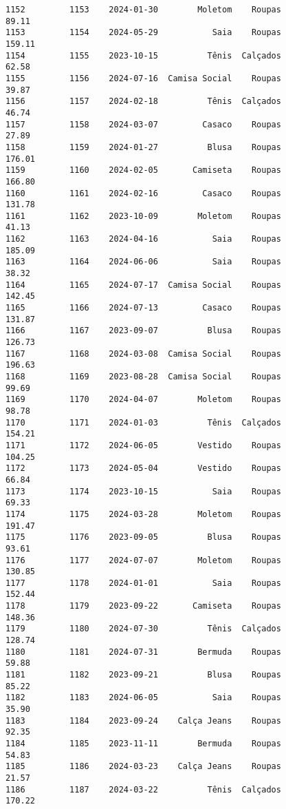 \documentclass[11pt]{article}
\begin{document}
\begin{Verbatim}[commandchars=\\\{\}]
1152         1153    2024-01-30        Moletom    Roupas           89.11   
1153         1154    2024-05-29           Saia    Roupas          159.11   
1154         1155    2023-10-15          Tênis  Calçados           62.58   
1155         1156    2024-07-16  Camisa Social    Roupas           39.87   
1156         1157    2024-02-18          Tênis  Calçados           46.74   
1157         1158    2024-03-07         Casaco    Roupas           27.89   
1158         1159    2024-01-27          Blusa    Roupas          176.01   
1159         1160    2024-02-05       Camiseta    Roupas          166.80   
1160         1161    2024-02-16         Casaco    Roupas          131.78   
1161         1162    2023-10-09        Moletom    Roupas           41.13   
1162         1163    2024-04-16           Saia    Roupas          185.09   
1163         1164    2024-06-06           Saia    Roupas           38.32   
1164         1165    2024-07-17  Camisa Social    Roupas          142.45   
1165         1166    2024-07-13         Casaco    Roupas          131.87   
1166         1167    2023-09-07          Blusa    Roupas          126.73   
1167         1168    2024-03-08  Camisa Social    Roupas          196.63   
1168         1169    2023-08-28  Camisa Social    Roupas           99.69   
1169         1170    2024-04-07        Moletom    Roupas           98.78   
1170         1171    2024-01-03          Tênis  Calçados          154.21   
1171         1172    2024-06-05        Vestido    Roupas          104.25   
1172         1173    2024-05-04        Vestido    Roupas           66.84   
1173         1174    2023-10-15           Saia    Roupas           69.33   
1174         1175    2024-03-28        Moletom    Roupas          191.47   
1175         1176    2023-09-05          Blusa    Roupas           93.61   
1176         1177    2024-07-07        Moletom    Roupas          130.85   
1177         1178    2024-01-01           Saia    Roupas          152.44   
1178         1179    2023-09-22       Camiseta    Roupas          148.36   
1179         1180    2024-07-30          Tênis  Calçados          128.74   
1180         1181    2024-07-31        Bermuda    Roupas           59.88   
1181         1182    2023-09-21          Blusa    Roupas           85.22   
1182         1183    2024-06-05           Saia    Roupas           35.90   
1183         1184    2023-09-24    Calça Jeans    Roupas           92.35   
1184         1185    2023-11-11        Bermuda    Roupas           54.83   
1185         1186    2024-03-23    Calça Jeans    Roupas           21.57   
1186         1187    2024-03-22          Tênis  Calçados          170.22   

\end{Verbatim}
\end{document}
